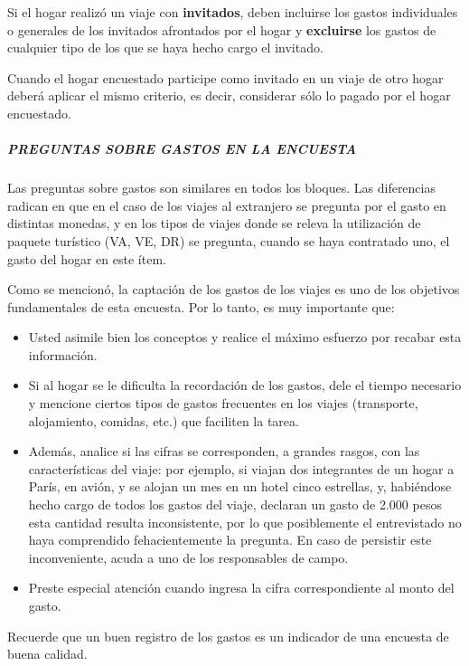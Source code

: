 \documentclass[
  openany]{book}
\begin{document}
Si el hogar realizó un viaje con \textbf{invitados}, deben incluirse los gastos individuales o generales de los invitados afrontados por el hogar y \textbf{excluirse} los gastos de cualquier tipo de los que se haya hecho cargo el invitado.

Cuando el hogar encuestado participe como invitado en un viaje de otro hogar deberá aplicar el mismo criterio, es decir, considerar sólo lo pagado por el hogar encuestado.

\hypertarget{preguntas-sobre-gastos-en-la-encuesta}{%
\subparagraph{\texorpdfstring{\textbf{PREGUNTAS SOBRE GASTOS EN LA ENCUESTA}}{PREGUNTAS SOBRE GASTOS EN LA ENCUESTA}}\label{preguntas-sobre-gastos-en-la-encuesta}}

Las preguntas sobre gastos son similares en todos los bloques. Las diferencias radican en que en el caso de los viajes al extranjero se pregunta por el gasto en distintas monedas, y en los tipos de viajes donde se releva la utilización de paquete turístico (VA, VE, DR) se pregunta, cuando se haya contratado uno, el gasto del hogar en este ítem.

Como se mencionó, la captación de los gastos de los viajes es uno de los objetivos fundamentales de esta encuesta. Por lo tanto, es muy importante que:

\begin{itemize}
\item
  Usted asimile bien los conceptos y realice el máximo esfuerzo por recabar esta información.
\item
  Si al hogar se le dificulta la recordación de los gastos, dele el tiempo necesario y mencione ciertos tipos de gastos frecuentes en los viajes (transporte, alojamiento, comidas, etc.) que faciliten la tarea.
\item
  Además, analice si las cifras se corresponden, a grandes rasgos, con las características del viaje: por ejemplo, si viajan dos integrantes de un hogar a París, en avión, y se alojan un mes en un hotel cinco estrellas, y, habiéndose hecho cargo de todos los gastos del viaje, declaran un gasto de 2.000 pesos esta cantidad resulta inconsistente, por lo que posiblemente el entrevistado no haya comprendido fehacientemente la pregunta. En caso de persistir este inconveniente, acuda a uno de los responsables de campo.
\item
  Preste especial atención cuando ingresa la cifra correspondiente al monto del gasto.
\end{itemize}

Recuerde que un buen registro de los gastos es un indicador de una encuesta de buena calidad.
\end{document}
